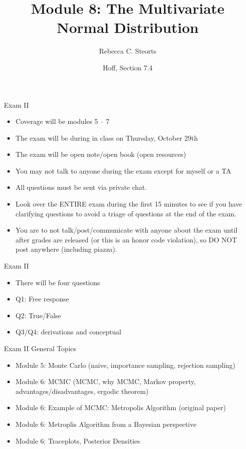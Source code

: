 \documentclass[
  ignorenonframetext,
]{beamer}
\title{Module 8: The Multivariate Normal Distribution}
\author{Rebecca C. Steorts}
\date{Hoff, Section 7.4}
\providecommand{\tightlist}{%
  \setlength{\itemsep}{0pt}\setlength{\parskip}{0pt}}
\begin{document}
\frame{\titlepage}

\begin{frame}{Exam II}
\protect\hypertarget{exam-ii}{}

\begin{itemize}
\tightlist
\item
  Coverage will be modules 5 -- 7
\item
  The exam will be during in class on Thursday, October 29th
\item
  The exam will be open note/open book (open resources)
\item
  You may not talk to anyone during the exam except for myself or a TA
\item
  All questions must be sent via private chat.
\item
  Look over the ENTIRE exam during the first 15 minutes to see if you
  have clarifying questions to avoid a triage of questions at the end of
  the exam.
\item
  You are to not talk/post/communicate with anyone about the exam until
  after grades are released (or this is an honor code violation), so DO
  NOT post anywhere (including piazza).
\end{itemize}

\end{frame}

\begin{frame}{Exam II}
\protect\hypertarget{exam-ii-1}{}

\begin{itemize}
\tightlist
\item
  There will be four questions
\item
  Q1: Free response
\item
  Q2: True/False
\item
  Q3/Q4: derivations and conceptual
\end{itemize}

\end{frame}

\begin{frame}{Exam II General Topics}
\protect\hypertarget{exam-ii-general-topics}{}

\begin{itemize}
\tightlist
\item
  Module 5: Monte Carlo (naive, importance sampling, rejection sampling)
\item
  Module 6: MCMC (MCMC, why MCMC, Markov property,
  advantages/disadvantages, ergodic theorem)
\item
  Module 6: Example of MCMC: Metropolis Algorithm (original paper)
\item
  Module 6: Metroplis Algorithm from a Bayesian perspective
\item
  Module 6: Traceplots, Posterior Densities
\end{itemize}

\end{frame}
\end{document}
